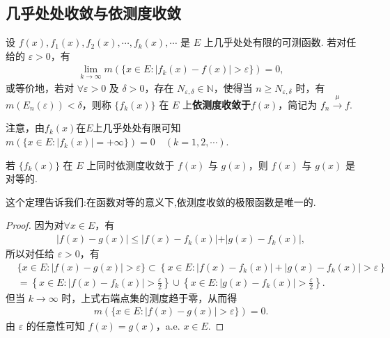 \documentclass[../../main.tex]{subfiles}
\begin{document}
\subsection{几乎处处收敛与依测度收敛}

\begin{definition}
设 $f(x),f_1(x),f_2(x),\cdots,f_k(x),\cdots$ 是 $E$ 上几乎处处有限的可测函数. 若对任给的 $\varepsilon>0$，有
\begin{align}
\lim_{k\to\infty}m(\{x\in E:\vert f_k(x)-f(x)\vert>\varepsilon\}) = 0,\label{eq:3.7}
\end{align}
或等价地，若对 $\forall\varepsilon > 0$ 及 $\delta > 0$，存在 $N_{\varepsilon,\delta}\in\mathbb{N}$，使得当 $n\geqslant N_{\varepsilon,\delta}$ 时，有 $m(E_n(\varepsilon)) < \delta$，则称 $\{f_k(x)\}$ 在 $E$ 上\textbf{依测度收敛于}$f(x)$，简记为 $f_n\stackrel{\mu}{\longrightarrow}f$. 
\end{definition}
\begin{remark}
注意，由$f_k(x)$在$E$上几乎处处有限可知$m(\{x\in E:\vert f_k(x)\vert=+\infty\}) = 0\quad (k = 1,2,\cdots)$. 
\end{remark}

\begin{theorem}\label{theorem:依测度收敛的极限函数必唯一}
若 $\{f_k(x)\}$ 在 $E$ 上同时依测度收敛于 $f(x)$ 与 $g(x)$，则 $f(x)$ 与 $g(x)$ 是对等的.
\end{theorem}
\begin{note}
这个定理告诉我们:在函数对等的意义下,依测度收敛的极限函数是唯一的.
\end{note}
\begin{proof}
因为对$\forall x\in E$，有
\begin{align*}
\vert f(x)-g(x)\vert\leqslant\vert f(x)-f_k(x)\vert+\vert g(x)-f_k(x)\vert,
\end{align*}
所以对任给 $\varepsilon>0$，有
\begin{align*}
&\{x\in E:\left| f(x)-g(x) \right|>\varepsilon \}\subset \left\{ x\in E:\left| f\left( x \right) -f_k\left( x \right) \right|+\left| g\left( x \right) -f_k\left( x \right) \right|>\varepsilon \right\} 
\\
&=\left\{ x\in E:\left| f(x)-f_k(x) \right|>\frac{\varepsilon}{2} \right\} \cup \left\{ x\in E:\left| g(x)-f_k(x) \right|>\frac{\varepsilon}{2} \right\} .
\end{align*}
但当 $k\to\infty$ 时，上式右端点集的测度趋于零，从而得
\begin{align*}
m(\{x\in E:\vert f(x)-g(x)\vert>\varepsilon\}) = 0.
\end{align*}
由 $\varepsilon$ 的任意性可知 $f(x)=g(x)$，a.e. $x\in E$. 
\end{proof}
\end{document}
